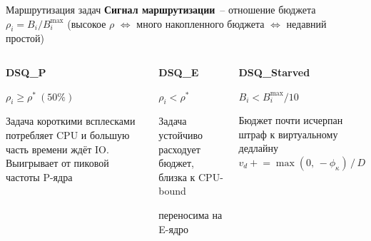 \documentclass[aspectratio=169]{beamer}
\begin{document}
\begin{frame}{Маршрутизация задач}
        \textbf{Сигнал маршрутизации}~-- отношение бюджета
        $\rho_i = B_i / B_i^{\max}$
        {\footnotesize (высокое $\rho$ $\Leftrightarrow$ много накопленного
        бюджета $\Leftrightarrow$ недавний простой)}

        \vspace{0.3em}
        \begin{columns}[T]
                \begin{shadowbox2}
                        \small\textbf{DSQ\_P}

                        \vspace{0.3em}
                        \footnotesize
                        $\rho_i \geq \rho^*\ (50\%)$

                        \vspace{0.2em}
                        Задача короткими всплесками
                        потребляет CPU и большую
                        часть времени ждёт IO.
                        Выигрывает от пиковой
                        частоты P-ядра
                \end{shadowbox2}

                \begin{shadowbox2}
                        \small\textbf{DSQ\_E}

                        \vspace{0.3em}
                        \footnotesize
                        $\rho_i < \rho^*$

                        \vspace{0.2em}
                        Задача устойчиво расходует
                        бюджет, близка к CPU-bound

                        переносима на E-ядро
                \end{shadowbox2}

                \begin{shadowbox2}
                        \small\textbf{DSQ\_Starved}

                        \vspace{0.3em}
                        \footnotesize
                        $B_i < B_i^{\max} / 10$

                        \vspace{0.2em}
                        Бюджет почти исчерпан
                        штраф к виртуальному
                        дедлайну
                        $v_d \mathrel{+}=
                        \max(0,\,-\phi_\kappa)\,/\,D$


\end{shadowbox2}
\end{columns}
\end{frame}
\end{document}
